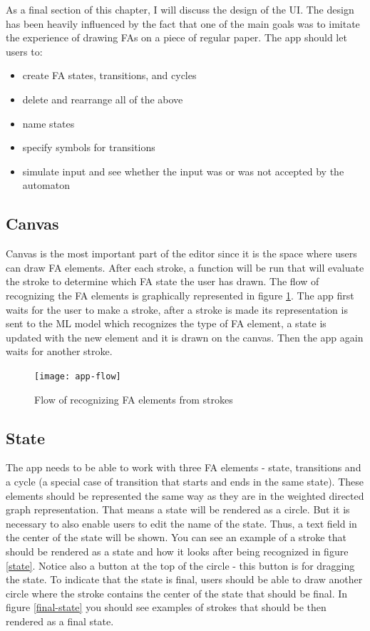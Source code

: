 As a final section of this chapter, I will discuss the design of the UI. The design has been heavily influenced by the fact that one of the main goals was to imitate the experience of drawing FAs on a piece of regular paper. The app should let users to:
\begin{itemize}
    \item create FA states, transitions, and cycles
    \item delete and rearrange all of the above
    \item name states
    \item specify symbols for transitions
    \item simulate input and see whether the input was or was not accepted by the automaton
\end{itemize}

\subsection{Canvas}

Canvas is the most important part of the editor since it is the space where users can draw FA elements. After each stroke, a function will be run that will evaluate the stroke to determine which FA state the user has drawn. The flow of recognizing the FA elements is graphically represented in figure \ref{app-flow}. The app first waits for the user to make a stroke, after a stroke is made its representation is sent to the ML model which recognizes the type of FA element, a state is updated with the new element and it is drawn on the canvas. Then the app again waits for another stroke.

\begin{figure}
    \texttt{[image: app-flow]}
    \caption{Flow of recognizing FA elements from strokes}\label{app-flow}
\end{figure}

\subsection{State}

The app needs to be able to work with three FA elements - state, transitions and a cycle (a special case of transition that starts and ends in the same state). These elements should be represented the same way as they are in the weighted directed graph representation. That means a state will be rendered as a circle. But it is necessary to also enable users to edit the name of the state. Thus, a text field in the center of the state will be shown. You can see an example of a stroke that should be rendered as a state and how it looks after being recognized in figure \ref{state}. Notice also a button at the top of the circle - this button is for dragging the state. To indicate that the state is final, users should be able to draw another circle where the stroke contains the center of the state that should be final. In figure \ref{final-state} you should see examples of strokes that should be then rendered as a final state.

